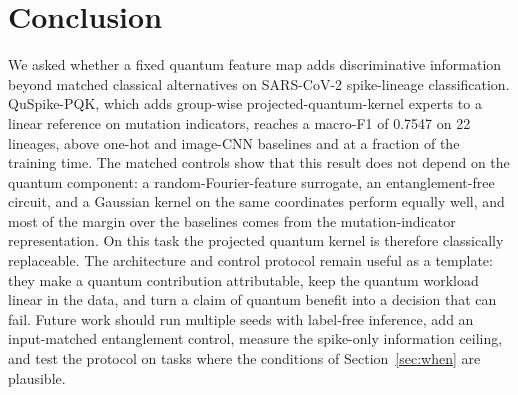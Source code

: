 \documentclass[conference]{IEEEtran}
\begin{document}
\section{Conclusion}
\label{sec:conclusion}

We asked whether a fixed quantum feature map adds discriminative information beyond matched classical alternatives on SARS-CoV-2 spike-lineage classification. QuSpike-PQK, which adds group-wise projected-quantum-kernel experts to a linear reference on mutation indicators, reaches a macro-F1 of 0.7547 on 22 lineages, above one-hot and image-CNN baselines and at a fraction of the training time. The matched controls show that this result does not depend on the quantum component: a random-Fourier-feature surrogate, an entanglement-free circuit, and a Gaussian kernel on the same coordinates perform equally well, and most of the margin over the baselines comes from the mutation-indicator representation. On this task the projected quantum kernel is therefore classically replaceable. The architecture and control protocol remain useful as a template: they make a quantum contribution attributable, keep the quantum workload linear in the data, and turn a claim of quantum benefit into a decision that can fail. Future work should run multiple seeds with label-free inference, add an input-matched entanglement control, measure the spike-only information ceiling, and test the protocol on tasks where the conditions of Section~\ref{sec:when} are plausible.
\end{document}
